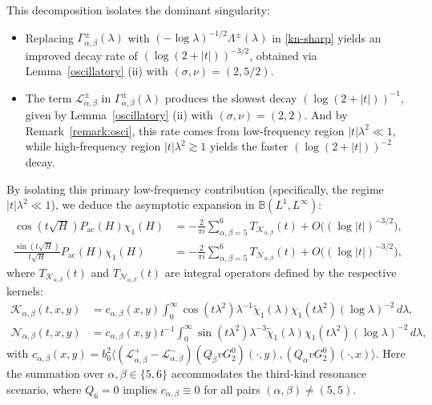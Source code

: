\documentclass[reqno]{amsart}
\numberwithin{equation}{section}
\begin{document}
	This decomposition isolates the dominant singularity:    
	\begin{itemize}
	\item Replacing $\Gamma_{\alpha,\beta}^{\pm}(\lambda)$ with $(-\log\lambda)^{-1/2}\Lambda^{\pm}(\lambda)$ in \eqref{kn-sharp} yields an improved decay rate of $(\log(2+|t|))^{-3/2}$, obtained via Lemma~\ref{oscillatory} (ii) with $(\sigma, \nu) = (2, 5/2)$.
    \vskip0.2cm
	\item The term $\mathcal{L}_{\alpha,\beta}^{\pm}$ in $\Gamma_{\alpha,\beta}^{\pm}(\lambda)$  produces the slowest decay $(\log(2+|t|))^{-1}$, given by Lemma~\ref{oscillatory} (ii) with $(\sigma, \nu) = (2, 2)$. And by Remark~\ref{remark:osci}, this rate comes from low-frequency region $|t|\lambda^2 \ll 1$, while high-frequency region $|t|\lambda^2 \gtrsim 1$ yields the faster $(\log(2+|t|))^{-2}$ decay.
\end{itemize} 



By isolating this primary low-frequency contribution (specifically, the regime $|t|\lambda^2 \ll 1$), we deduce the asymptotic expansion in $\mathbb{B}(L^1, L^\infty)$:      
\[      
	\begin{aligned}      
		\cos (t \sqrt{H}) P_{\mathrm{ac}}(H)\chi_1(H) &= -\frac{2}{\pi i}\sum_{\alpha,\beta = 5}^{6} T_{\mathcal{K}_{\alpha,\beta}}(t) + {O}\Big((\log|t|)^{-3/2}\Big), \\      
		\frac{\sin (t \sqrt{H})}{t\sqrt{H}} P_{\mathrm{ac}}(H)\chi_1(H) &= -\frac{2}{\pi i}\sum_{\alpha,\beta = 5}^{6} T_{\mathcal{N}_{\alpha,\beta}}(t) + {O}\Big((\log|t|)^{-3/2}\Big),   
	\end{aligned}      
\]    
where $T_{\mathcal{K}_{\alpha,\beta}}(t)$ and $T_{\mathcal{N}_{\alpha,\beta}}(t)$ are integral operators defined by the respective kernels:    
\[
\begin{aligned}      
	\mathcal{K}_{\alpha,\beta}(t,x,y) &= c_{\alpha,\beta}(x,y)\int_0^{\infty} \cos(t\lambda^2) \lambda^{-1} \widetilde{\chi}_1(\lambda)\chi_1(t \lambda^2) (\log \lambda)^{-2} \, d\lambda, \\      
	\mathcal{N}_{\alpha,\beta}(t,x,y) &= {c_{\alpha,\beta}(x,y)}{t}^{-1} \int_0^{\infty} \sin(t\lambda^2) \lambda^{-3} \widetilde{\chi}_1(\lambda) \chi_1(t \lambda^2) (\log \lambda)^{-2} \, d\lambda,   
\end{aligned}
\]
with  $c_{\alpha,\beta}(x,y) = b_0^2 \big\langle (\mathcal{L}_{\alpha,\beta}^+ -\mathcal{L}_{\alpha,\beta}^-) (Q_\beta v G_2^0)(\cdot, y), (Q_\alpha v G_2^0)(\cdot, x) \big\rangle$.   
Here the summation over $\alpha, \beta \in \{5,6\}$ accommodates the third-kind resonance scenario, where $Q_6 = 0$ implies $c_{\alpha,\beta} \equiv 0$ for all pairs $(\alpha,\beta) \neq (5,5)$.  
  
\end{document}
